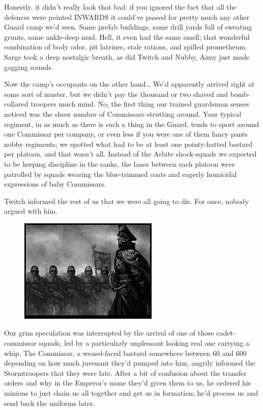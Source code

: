 Honestly, it didn't really look that bad: 
if you ignored the fact that all the defences were pointed INWARDS it could've passed for pretty much any other Guard camp we'd seen. 
Same prefab buildings, same drill yards full of sweating grunts, same ankle-deep mud. 
Hell, it even had the same smell; 
that wonderful combination of body odor, pit latrines, stale rations, and spilled prometheum. 
Sarge took a deep nostalgic breath, as did Twitch and Nubby, Aimy just made gagging sounds.

Now the camp's occupants on the other hand… We'd apparently arrived right at some sort of muster, but we didn't pay the thousand or two shaved and bomb-collared troopers much mind. 
No, the first thing our trained guardsman senses noticed was the sheer number of Commissars strutting around. 
Your typical regiment, in as much as there is such a thing in the Guard, tends to sport around one Commissar per company, or even less if you were one of them fancy pants nobby regiments; 
we spotted what had to be at least one pointy-hatted bastard per platoon, and that wasn't all. 
Instead of the Arbite shock-squads we expected to be keeping discipline in the ranks, the lanes between each platoon were patrolled by squads wearing the blue-trimmed coats and eagerly homicidal expressions of baby Commissars.

Twitch informed the rest of us that we were all going to die. 
For once, nobody argued with him.

\begin{figure}
	\begin{center}
		\includegraphics[width=\figwidth]{pics/21/7.png}
	\end{center}
\end{figure}
Our grim speculation was interrupted by the arrival of one of those cadet-commissar squads, led by a particularly unpleasant looking real one carrying a whip. 
The Commissar, a weasel-faced bastard somewhere between 60 and 600 depending on how much juvenant they'd pumped into him, angrily informed the Stormtroopers that they were late. 
After a bit of confusion about the transfer orders and why in the Emperor's name they'd given them to us, he ordered his minions to just chain us all together and get us in formation; 
he'd process us and send back the uniforms later.

